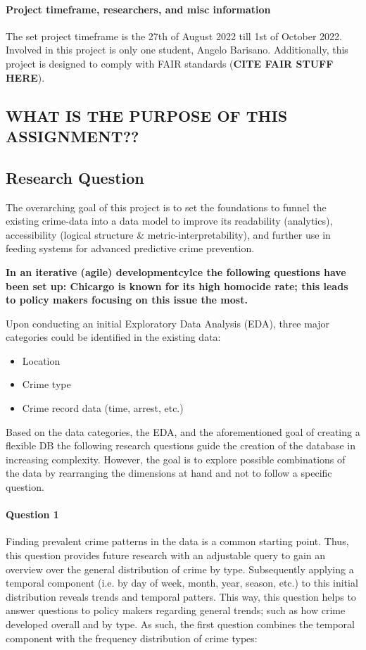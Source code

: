 \documentclass[a4paper]{article}
\begin{document}
\paragraph{Project timeframe, researchers, and misc information} The set project timeframe is the 27th of August 2022 till 1st of October 2022. Involved in this project is only one student, Angelo Barisano. Additionally, this project is designed to comply with FAIR standards (\textbf{CITE FAIR STUFF HERE}).

\subsection{WHAT IS THE PURPOSE OF THIS ASSIGNMENT??}

\subsection{Research Question}
The overarching goal of this project is to set the foundations to funnel the existing crime-data into a data model to improve its readability (analytics), accessibility (logical structure \& metric-interpretability), and further use in feeding systems for advanced predictive crime prevention. 


\textbf{In an iterative (agile) developmentcylce the following questions have been set up: Chicargo is known for its high homocide rate; this leads to policy makers focusing on this issue the most. }

Upon conducting an initial Exploratory Data Analysis (EDA), three major categories could be identified in the existing data: 

\begin{itemize}
  \item Location
  \item Crime type
  \item Crime record data (time, arrest, etc.)
\end{itemize}

Based on the data categories, the EDA, and the aforementioned goal of creating a flexible DB the following research questions guide the creation of the database in increasing complexity. However, the goal is to explore possible combinations of the data by rearranging the dimensions at hand and not to follow a specific question.

\paragraph{Question 1} Finding prevalent crime patterns in the data is a common starting point. Thus, this question provides future research with an adjustable query to gain an overview over the general distribution of crime by type. Subsequently applying a temporal component (i.e. by day of week,  month, year, season, etc.) to this initial distribution reveals trends and temporal patters. This way, this question helps to answer questions to policy makers regarding general trends; such as how crime developed overall and by type. As such, the first question combines the temporal component with the frequency distribution of crime types:
\end{document}

